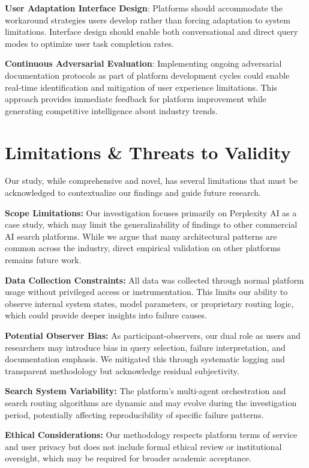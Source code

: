\documentclass[12pt]{article}
\begin{document}
\textbf{User Adaptation Interface Design}: Platforms should accommodate the workaround strategies users develop rather than forcing adaptation to system limitations. Interface design should enable both conversational and direct query modes to optimize user task completion rates.

\textbf{Continuous Adversarial Evaluation}: Implementing ongoing adversarial documentation protocols as part of platform development cycles could enable real-time identification and mitigation of user experience limitations. This approach provides immediate feedback for platform improvement while generating competitive intelligence about industry trends.


\section{Limitations \& Threats to Validity}

Our study, while comprehensive and novel, has several limitations that must be acknowledged to contextualize our findings and guide future research.

\textbf{Scope Limitations:} Our investigation focuses primarily on Perplexity AI as a case study, which may limit the generalizability of findings to other commercial AI search platforms. While we argue that many architectural patterns are common across the industry, direct empirical validation on other platforms remains future work.

\textbf{Data Collection Constraints:} All data was collected through normal platform usage without privileged access or instrumentation. This limits our ability to observe internal system states, model parameters, or proprietary routing logic, which could provide deeper insights into failure causes.

\textbf{Potential Observer Bias:} As participant-observers, our dual role as users and researchers may introduce bias in query selection, failure interpretation, and documentation emphasis. We mitigated this through systematic logging and transparent methodology but acknowledge residual subjectivity.

\textbf{Search System Variability:} The platform's multi-agent orchestration and search routing algorithms are dynamic and may evolve during the investigation period, potentially affecting reproducibility of specific failure patterns.

\textbf{Ethical Considerations:} Our methodology respects platform terms of service and user privacy but does not include formal ethical review or institutional oversight, which may be required for broader academic acceptance.
\end{document}
